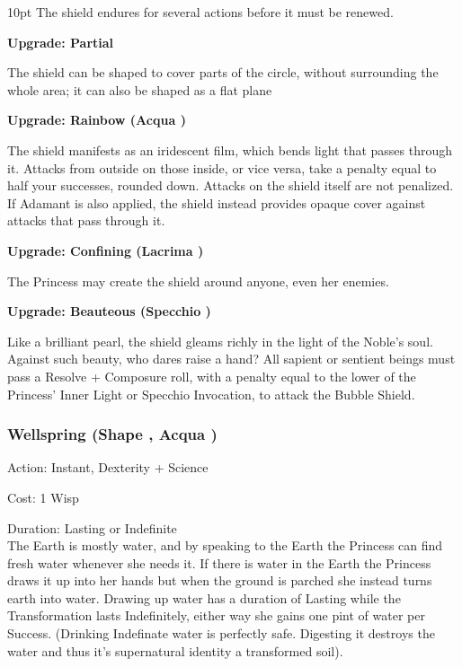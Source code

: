 \begin{myindentpar}{10pt}
The shield endures for several actions before it must be renewed.

\textbf{Upgrade: Partial}

The shield can be shaped to cover parts of the circle, without surrounding the whole area; it can also be shaped as a flat plane

\textbf{Upgrade: Rainbow (Acqua \textbullet)}

The shield manifests as an iridescent film, which bends light that passes through it. Attacks from outside on those inside, or vice versa, take a penalty equal to half your successes, rounded down. Attacks on the shield itself are not penalized. If Adamant is also applied, the shield instead provides opaque cover against attacks that pass through it.

\textbf{Upgrade: Confining (Lacrima \textbullet)}

The Princess may create the shield around anyone, even her enemies.

\textbf{Upgrade: Beauteous (Specchio \textbullet)}

Like a brilliant pearl, the shield gleams richly in the light of the Noble's soul. Against such beauty, who dares raise a hand? All sapient or sentient beings must pass a Resolve + Composure roll, with a penalty equal to the lower of the Princess' Inner Light or Specchio Invocation, to attack the Bubble Shield.\end{myindentpar}

\subsubsection*{Wellspring (Shape \textbullet, Acqua \textbullet)}

\noindent Action: Instant, Dexterity + Science

\noindent Cost: 1 Wisp

\noindent Duration: Lasting or Indefinite\\

\noindent The Earth is mostly water, and by speaking to the Earth the Princess can find fresh water whenever she needs it. If there is water in the Earth the Princess draws it up into her hands but when the ground is parched she instead turns earth into water. Drawing up water has a duration of Lasting while the Transformation lasts Indefinitely, either way she gains one pint of water per Success. (Drinking Indefinate water is perfectly safe. Digesting it destroys the water and thus it's supernatural identity a transformed soil).

